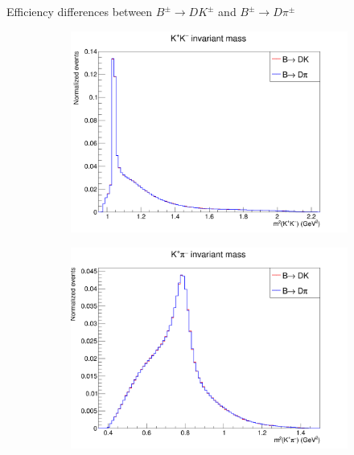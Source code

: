 \documentclass{beamer}
\begin{document}
\begin{frame}{Efficiency differences between $B^\pm\to DK^\pm$ and $B^\pm\to D\pi^\pm$}
  \begin{figure}
    \centering
    \begin{subfigure}{0.33\textwidth}
      \includegraphics[width = 1.0\textwidth]{Plots/Dalitz_s01.png}
    \end{subfigure}%
    \begin{subfigure}{0.33\textwidth}
      \includegraphics[width = 1.0\textwidth]{Plots/Dalitz_s03.png}
    \end{subfigure}%
    \begin{subfigure}{0.33\textwidth}

\end{subfigure}
\end{figure}
\end{frame}
\end{document}
